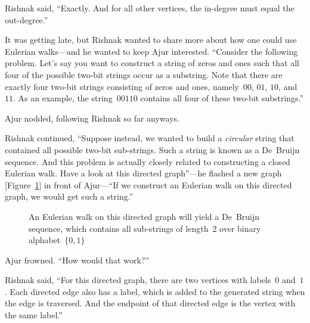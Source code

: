 Rishnak said, ``Exactly. And for all other vertices, the in-degree must equal the out-degree.''

It was getting late, but Rishnak wanted to share more about how one could use Eulerian walks---and he wanted to keep Ajur interested. ``Consider the following problem. Let's say you want to construct a string of zeros and ones such that all four of the possible two-bit strings occur as a substring. Note that there are exactly four two-bit strings consisting of zeros and ones, namely~$00$, $01$, $10$, and~$11$. As an example, the string~$00110$ contains all four of these two-bit substrings.''

Ajur nodded, following Rishnak so far anyways.

Rishnak continued, ``Suppose instead, we wanted to build a \textit{circular} string that contained all possible two-bit sub-strings. Such a string is known as a De~Bruijn sequence. And this problem is actually closely related to constructing a closed Eulerian walk. Have a look at this directed graph''---he flashed a new graph [Figure~\ref{4g55}] in front of Ajur---``If we construct an Eulerian walk on this directed graph, we would get such a string.''

\begin{figure}
\begin{center}
\caption{An Eulerian walk on this directed graph will yield a De~Bruijn sequence, which contains all sub-strings of length~2 over binary alphabet~$\{0,1\}$}\label{4g55}
\end{center}
\end{figure}

Ajur frowned. ``How would that work?''

Rishnak said, ``For this directed graph, there are two vertices with labels~$0$ and~$1$. Each directed edge also has a label, which is added to the generated string when the edge is traversed. And the endpoint of that directed edge is the vertex with the same label.''

